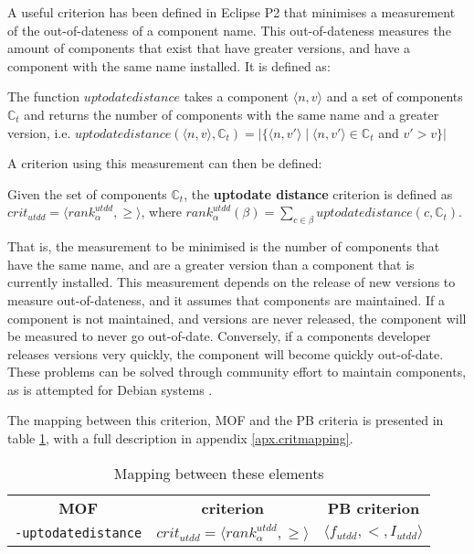A useful criterion has been defined in Eclipse P2 that minimises a measurement of the out-of-dateness of a component name.
This out-of-dateness measures the amount of components that exist that have greater versions, and have a component with the same name installed.
It is defined as:
\begin{defs}
The function $uptodatedistance$ takes a component $\langle n, v \rangle$ and a set of components $\mathbb{C}_t$ and returns the number of components with the same name and a greater version,
i.e. $uptodatedistance(\langle n, v \rangle,\mathbb{C}_t) = |\{\langle n, v' \rangle \mid \langle n, v' \rangle \in \mathbb{C}_t $ and $ v' > v \}|$
\end{defs}

A criterion using this measurement can then be defined:
\begin{defs}
	Given the set of components $\mathbb{C}_t$, the \textbf{uptodate distance} criterion is defined as $crit_{utdd} = \langle rank^{utdd}_{\alpha}, \geq \rangle$,
	where $rank^{utdd}_{\alpha}(\beta) = \sum_{c \in \beta} uptodatedistance(c,\mathbb{C}_t)$.
\end{defs}
That is, the measurement to be minimised is the number of components that have the same name, and are a greater version than a component that is currently installed.
This measurement depends on the release of new versions to measure out-of-dateness, and it assumes that components are maintained.
If a component is not maintained, and versions are never released, the component will be measured to never go out-of-date.
Conversely, if a components developer releases versions very quickly, the component will become quickly out-of-date.
These problems can be solved through community effort to maintain components, as is attempted for Debian systems \citep{Barth2005}.

The mapping between this criterion, MOF and the PB criteria is presented in table \ref{impl.ucritmapping}, with a full description in appendix \ref{apx.critmapping}.
\begin{table}
\begin{tabular}{c | c | c}
\textbf{MOF} 		& \textbf{\modelname criterion} & \textbf{PB criterion} \\
\texttt{-uptodatedistance} 	& $crit_{utdd} = \langle rank^{utdd}_{\alpha}, \geq \rangle$ & $\langle f_{utdd}, <, I_{utdd} \rangle$ \\
\end{tabular}
\caption{Mapping between these elements}
\label{impl.ucritmapping}
\end{table}

